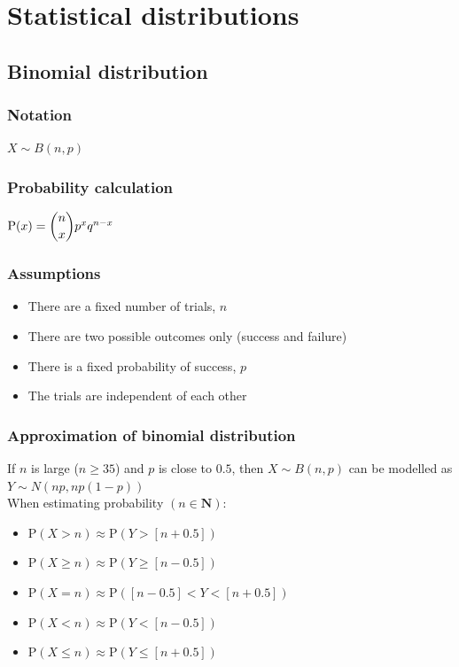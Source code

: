 \documentclass[A4paper, 11pt]{article}
\begin{document}
	\pagebreak
	
	\section{Statistical distributions}
	\subsection{Binomial distribution}
	\subsubsection{Notation}
	$X \sim B(n,p)$
	\subsubsection{Probability calculation}
	$\text{P}(x) = \dbinom{n}{x} p^x q^{n-x}$
	\subsubsection{Assumptions}
	\begin{itemize}
		\item There are a fixed number of trials, $n$
		\item There are two possible outcomes only (success and failure)
		\item There is a fixed probability of success, $p$
		\item The trials are independent of each other
	\end{itemize}
	\subsubsection{Approximation of binomial distribution}
	If $n$ is large ($n\geq35$) and $p$ is close to $0.5$, then $X \sim B(n,p)$ can be modelled as $Y \sim N(np, np(1-p))$\\
	When estimating probability $(n\in \textbf{N})$:
	\begin{itemize}
		\item $\text{P}(X>n)\approx \text{P}(Y>[n+0.5])$
		\item $\text{P}(X\geq n)\approx \text{P}(Y\geq [n-0.5])$
		\item $\text{P}(X=n)\approx \text{P}([n-0.5]<Y<[n+0.5])$
		\item $\text{P}(X<n)\approx \text{P}(Y<[n-0.5])$
		\item $\text{P}(X \leq n)\approx \text{P}(Y\leq [n+0.5])$
	\end{itemize}
	
\end{document}
